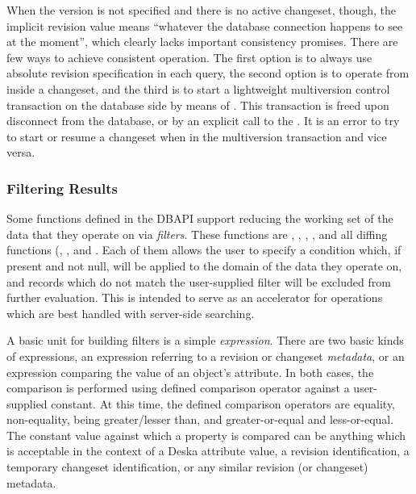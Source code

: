 \documentclass{article}
\begin{document}
When the version is not specified and there is no active changeset, though, the implicit revision value means ``whatever
the database connection happens to see at the moment'', which clearly lacks important consistency promises.  There are
few ways to achieve consistent operation.  The first option is to always use absolute revision specification in each
query,  the second option is to operate from inside a changeset, and the third is to start a lightweight multiversion
control transaction on the database side by means of .  This transaction is freed upon
disconnect from the database, or by an explicit call to the .  It is an error to try to start
or resume a changeset when in the multiversion transaction and vice versa.

\subsubsection{Filtering Results}
\label{sec:api-filters}

Some functions defined in the DBAPI support reducing the working set of the data that they operate on via {\em filters}.
These functions are , ,
, ,  and all
diffing functions (, ,
 and .  Each of them
allows the user to specify a condition which, if present and not null, will be applied to the domain of the data they
operate on, and records which do not match the user-supplied filter will be excluded from further evaluation.  This is
intended to serve as an accelerator for operations which are best handled with server-side searching.

A basic unit for building filters is a simple {\em expression}.  There are two basic kinds of expressions, an expression
referring to a revision or changeset {\em metadata}, or an expression comparing the value of an object's attribute.  In
both cases, the comparison is performed using defined comparison operator against a user-supplied constant.  At this
time, the defined comparison operators are equality, non-equality, being greater/lesser than, and greater-or-equal and
less-or-equal.  The constant value against which a property is compared can be anything which is acceptable in the
context of a Deska attribute value, a revision identification, a temporary changeset identification, or any similar
revision (or changeset) metadata.
\end{document}
